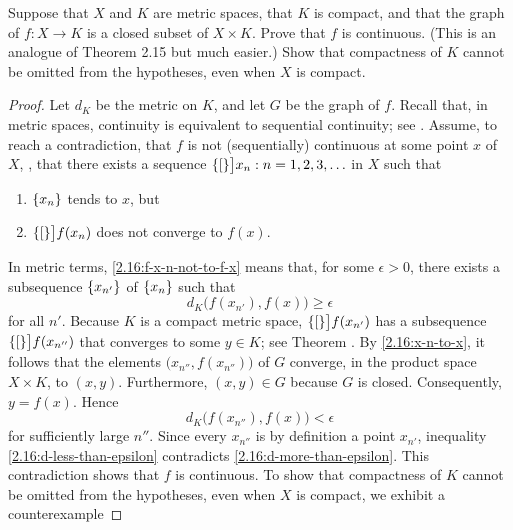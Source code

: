 \begin{exerciseStatement}
Suppose that $X$ and $K$ are metric spaces, that $K$ is compact, and that the graph of $f\colon X \to K$ is a closed subset %
of $X \times K$. Prove that $f$ is continuous. (This is an analogue of Theorem 2.15 but much easier.) Show that compactness %
of $K$ cannot be omitted from the hypotheses, even when $X$ is compact.
\end{exerciseStatement}
%
\begin{proof}\leavevmode
Let $d_K$ be the metric on $K$, and let $G$ be the graph of $f$. Recall that, in metric spaces, continuity is equivalent to %
sequential continuity; see . Assume, to reach a contradiction, that $f$ is not (sequentially) continuous at some %
point $x$ of $X$, \ie, that there exists a sequence $\{[\}\big]{x_n: n=1, 2, 3, \dots}$ in $X$ such that
%
\begin{enumerate}[item-label=(\alph{enumi})]
  \renewcommand{\theenumi}{\alph{enumi}}%
  \item $\{x_n\}$ tends to $x$, but
    \label{2.16:x-n-to-x}
  \item $\{[\}\big]{f(x_n)}$ does not converge to $f(x)$.
    \label{2.16:f-x-n-not-to-f-x}
\end{enumerate}
%
In metric terms, \eqref{2.16:f-x-n-not-to-f-x} means that, for some $\epsilon > 0$, there exists a subsequence %
$\{x_{n'}\}$ of $\{x_{n}\}$ such that
%
\begin{equation}\label{2.16:d-more-than-epsilon}
  d_K\bigl(f(x_{n'}), f(x)\bigr) \geq \epsilon
\end{equation}
%
for all $n'$. Because $K$ is a compact metric space, $\{[\}\big]{f(x_{n'})}$ has a subsequence %
$\{[\}\big]{f(x_{n''})}$ that converges to some $y \in K$; see Theorem . By \eqref{2.16:x-n-to-x}, it %
follows that the elements $\bigl(x_{n''}, f(x_{n''})\bigr)$ of $G$ converge, in the product space $X \times K$, to $(x, y)$. %
Furthermore, $(x, y) \in G$ because $G$ is closed. Consequently, $y = f(x)$. Hence
%
\begin{equation}\label{2.16:d-less-than-epsilon}
  d_K\bigl(f(x_{n''}), f(x)\bigr) < \epsilon
\end{equation}
%
for sufficiently large $n''$. Since every $x_{n''}$ is by definition a point $x_{n'}$, inequality %
\eqref{2.16:d-less-than-epsilon} contradicts \eqref{2.16:d-more-than-epsilon}. This contradiction shows that $f$ is continuous.
\skipline
To show that compactness of $K$ cannot be omitted from the hypotheses, even when $X$ is compact, we exhibit a counterexample %

\end{proof}
